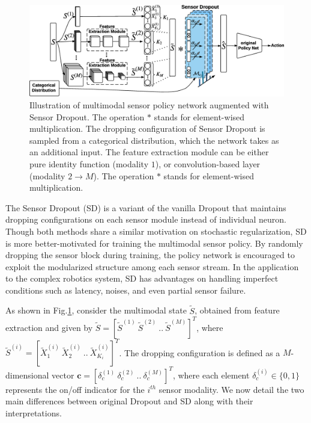 \documentclass[../thesis.tex]{subfiles}
\begin{document}
\begin{figure}[t]
	\begin{center}
	\centerline{\includegraphics[width=0.8\columnwidth]{./MultimodalDRL/fig/SD_new}} %
	\caption{Illustration of multimodal sensor policy network augmented with Sensor Dropout. The operation $*$ stands for element-wised multiplication. The dropping configuration of Sensor Dropout is sampled from a categorical distribution, which the network takes as an additional input. The feature extraction module can be either pure identity function (modality $1$), or convolution-based layer (modality $2 \to M$). The operation $*$ stands for element-wised multiplication.}
	\label{fig:Multi-SD}
	\end{center}
\end{figure} 


The Sensor Dropout (SD) is a variant of the vanilla Dropout \cite{dropout} that maintains dropping configurations on each sensor module instead of individual neuron. Though both methods share a similar motivation on stochastic regularization, SD is more better-motivated for training the multimodal sensor policy. By randomly dropping the sensor block during training, the policy network is encouraged to exploit the modularized structure among each sensor stream. In the application to the complex robotics system, SD has advantages on handling imperfect conditions such as latency, noises, and even partial sensor failure.


As shown in Fig.\ref{fig:Multi-SD}, consider the multimodal state $\tilde{S}$, obtained from feature extraction and given by $\tilde{S}=[\tilde{S}^{(1)}~\tilde{S}^{(2)}~..~\tilde{S}^{(M)}]^T$, where $\tilde{S}^{(i)}= [\tilde{X}_1^{(i)}~\tilde{X}_2^{(i)}~..~\tilde{X}_{K_i}^{(i)}]^T$. 
The dropping configuration is defined as a $M$-dimensional vector $\mathbf{c} = [\delta_{c}^{(1)}~\delta_{c}^{(2)}~..~\delta_{c}^{(M)}]^T$, where each element $\delta_{c}^{(i)} \in \{0,1\}$ represents the on/off indicator for the $i^{th}$ sensor modality. We now detail the two main differences between original Dropout and SD along with their interpretations. 
\end{document}

